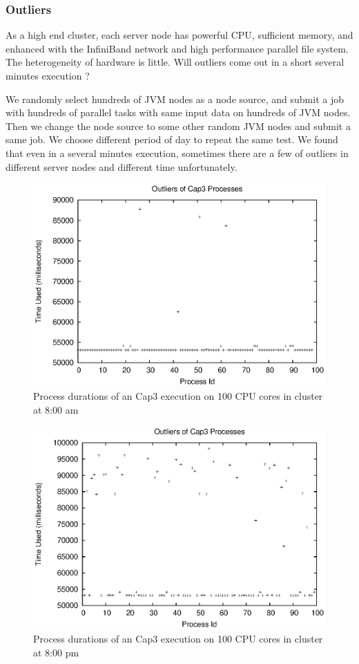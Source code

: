 \subsubsection{Outliers}
As a high end cluster, each server node has powerful CPU, sufficient memory, and enhanced
with the InfiniBand network and high performance parallel file system. The heterogeneity
of hardware is little. Will outliers come out in a short several minutes execution ?

We randomly select hundreds of JVM nodes as a node source, and submit a job with hundreds
of parallel tasks with same input data on hundreds of JVM nodes. Then we change the node
source to some other random JVM nodes and submit a same job. We choose different period of
day to repeat the same test. We found that even in a several minutes execution, sometimes
there are a few of outliers in different server nodes and different time unfortunately.

\begin{figure}
\centering
\includegraphics[width=0.9\columnwidth]{figures/outliers.eps}
\caption{Process durations of an Cap3 execution on 100 CPU cores in cluster at 8:00 am}
\label{figure:outlier}
\end{figure}

\begin{figure}
\centering
\includegraphics[width=0.9\columnwidth]{figures/yaoutliers.eps}
\caption{Process durations of an Cap3 execution on 100 CPU cores in cluster at 8:00 pm}
\label{figure:yaoutlier}
\end{figure}

